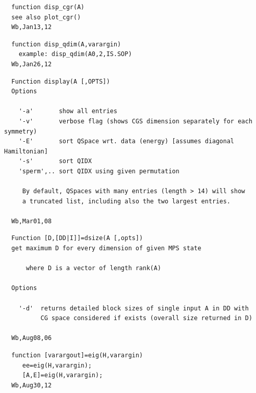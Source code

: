 \documentclass[twoside,12pt]{article}
\begin{document}
\pagebreak[3]



\begin{verbatim}
  function disp_cgr(A)
  see also plot_cgr()
  Wb,Jan13,12
\end{verbatim}

\pagebreak[3]



\begin{verbatim}
  function disp_qdim(A,varargin)
    example: disp_qdim(A0,2,IS.SOP)
  Wb,Jan26,12
\end{verbatim}

\pagebreak[3]



\begin{verbatim}
  Function display(A [,OPTS])
  Options
 
    '-a'       show all entries
    '-v'       verbose flag (shows CGS dimension separately for each symmetry)
    '-E'       sort QSpace wrt. data (energy) [assumes diagonal Hamiltonian]
    '-s'       sort QIDX
    'sperm',.. sort QIDX using given permutation
 
     By default, QSpaces with many entries (length > 14) will show
     a truncated list, including also the two largest entries.
 
  Wb,Mar01,08
\end{verbatim}

\pagebreak[3]



\begin{verbatim}
  Function [D,[DD|I]]=dsize(A [,opts])
  get maximum D for every dimension of given MPS state
 
      where D is a vector of length rank(A)
 
  Options
 
    '-d'  returns detailed block sizes of single input A in DD with
          CG space considered if exists (overall size returned in D)
 
  Wb,Aug08,06
\end{verbatim}

\pagebreak[3]



\begin{verbatim}
  function [varargout]=eig(H,varargin)
     ee=eig(H,varargin);
     [A,E]=eig(H,varargin);
  Wb,Aug30,12
\end{verbatim}
\end{document}
